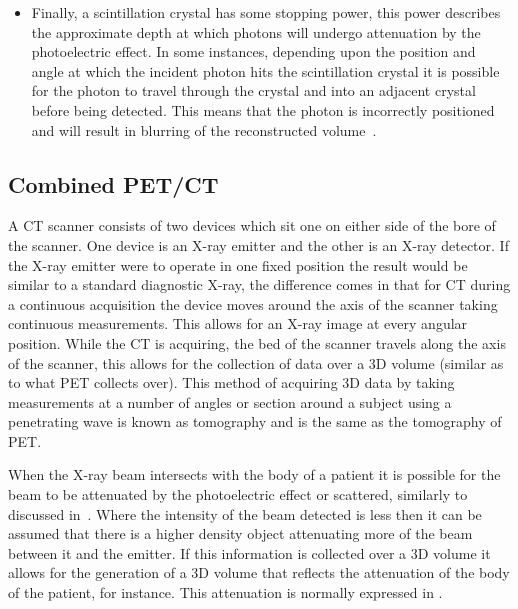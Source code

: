 \begin{itemize}
                    \item Finally, %
                    a scintillation crystal has some stopping power, this power describes the approximate depth at which photons will undergo attenuation by the photoelectric effect. In some instances, depending upon the position and angle at which the incident photon hits the scintillation crystal it is possible for the photon to travel through the crystal and into an adjacent crystal before being detected. This means that the photon is incorrectly positioned and will result in blurring of the reconstructed volume~\parencite{Nieman2015}.
                \end{itemize}
        
        \subsection{Combined PET/CT} \label{sec:combined_pet_ct}
            A \gls{CT} scanner consists of two devices which sit one on either side of the bore of the scanner. %
            One device is an X-ray emitter and the other is an X-ray detector. If the X-ray emitter were to operate in one fixed position the result would be similar to a standard diagnostic X-ray, the difference comes in that for \gls{CT} during a continuous acquisition the device moves around the axis of the scanner taking continuous measurements. This allows for an X-ray image at every angular position. While the \gls{CT} is acquiring, the bed of the scanner travels along the axis of the scanner, %
            this allows for the collection of data over a \gls{3D} volume (similar as to what \gls{PET} collects over). This method of acquiring \gls{3D} data by taking measurements at a number of angles or section around a subject using a penetrating wave is known as tomography and is the same as the tomography of \gls{PET}.
            
            When the X-ray beam intersects with the body of a patient it is possible for the beam to be attenuated by the photoelectric effect or scattered,%
            similarly to discussed in~. Where the intensity of the beam detected is less then it can be assumed that there is a higher density object attenuating more of the beam between it and the emitter. If this information is collected over a \gls{3D} volume it allows for the generation of a \gls{3D} volume that reflects the attenuation of the body of the patient, for instance. This attenuation is normally expressed in .
            
